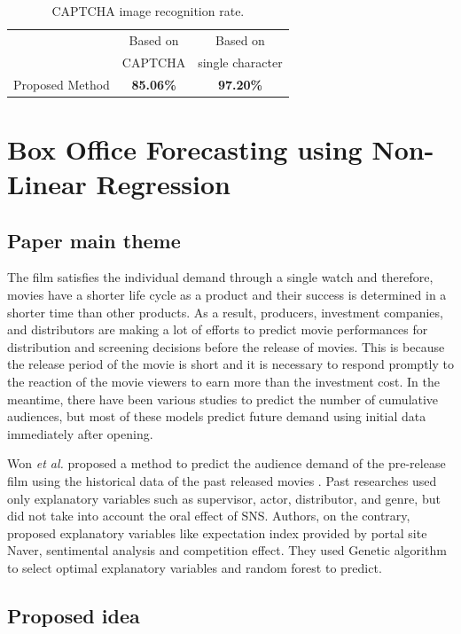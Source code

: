 \documentclass{ieeeaccess}
\begin{document}
\begin{table}[t]
	\centering
	\caption{CAPTCHA image recognition rate.}
		\begin{tabular}{|c|c|c|}
			\hline
			& Based on & Based on  \\
			& CAPTCHA & single character \\	\hline \hline
			Proposed Method & \textbf{85.06\%} & \textbf{97.20\%} \\ \hline
		\end{tabular}
	\label{table3}
\end{table}


\section{Box Office Forecasting using Non-Linear Regression}
\label{third}
\subsection{Paper main theme}
The film satisfies the individual demand through a single watch and therefore, movies have a shorter life cycle as a product and their success is determined in a shorter time than other products. 
As a result, producers, investment companies, and distributors are making a lot of efforts to predict movie performances for distribution and screening decisions before the release of movies. 
This is because the release period of the movie is short and it is necessary to respond promptly to the reaction of the movie viewers to earn more than the investment cost. 
In the meantime, there have been various studies to predict the number of cumulative audiences, but most of these models predict future demand using initial data immediately after opening. 

Won \textit{et al.} proposed a method to predict the audience demand of the pre-release film using the historical data of the past released movies \cite{paper3}. 
Past researches used only explanatory variables such as supervisor, actor, distributor, and genre, but did not take into account the oral effect of SNS. 
Authors, on the contrary, proposed explanatory variables like expectation index provided by portal site Naver, sentimental analysis and competition effect. 
They used Genetic algorithm to select optimal explanatory variables and random forest to predict.

\subsection{Proposed idea}
\end{document}
